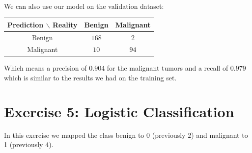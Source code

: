 \documentclass[a4paper, 10pt]{article}
\begin{document}
\\
We can also use our model on the validation dataset:
\begin{center}
    \begin{tabular}{ |c|c|c| }
        \hline
        Prediction $\backslash$ Reality & Benign & Malignant \\
        \hline
        Benign & $168$ & $2$ \\
        \hline
        Malignant & $10$ & $94$ \\ 
        \hline
    \end{tabular}
\end{center}
Which means a precision of $0.904$ for the malignant tumors and a recall of $0.979$ which is similar to 
the results we had on the training set.

\section{Exercise 5: Logistic Classification}
In this exercise we mapped the class benign to 0 (previously 2) and malignant to 1 (previously 4).
\end{document}
